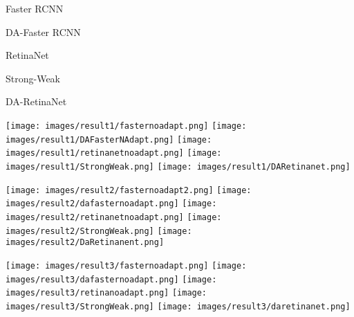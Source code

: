 \documentclass[preprint]{elsarticle}
\begin{document}
\begin{figure*}[t!]
            \centering
            \begin{minipage}{.19\textwidth}
            \centering
             Faster RCNN\\
            \end{minipage}
            \begin{minipage}{.19\textwidth}
            \centering
            DA-Faster RCNN\\
            \end{minipage}
            \begin{minipage}{.19\textwidth}
            \centering
             RetinaNet\\
            \end{minipage}
            \begin{minipage}{.19\textwidth}
            \centering
             Strong-Weak\\
            \end{minipage}
            \begin{minipage}{.19\textwidth}
            \centering
             DA-RetinaNet\\
            \end{minipage}
            
            \vspace{1mm}
            \texttt{[image: images/result1/fasternoadapt.png]}
            \texttt{[image: images/result1/DAFasterNAdapt.png]}
            \texttt{[image: images/result1/retinanetnoadapt.png]}
            \texttt{[image: images/result1/StrongWeak.png]}
            \texttt{[image: images/result1/DARetinanet.png]}
            
            \vspace{1mm}
            \texttt{[image: images/result2/fasternoadapt2.png]}
            \texttt{[image: images/result2/dafasternoadapt.png]}
            \texttt{[image: images/result2/retinanetnoadapt.png]}
            \texttt{[image: images/result2/StrongWeak.png]}
            \texttt{[image: images/result2/DaRetinanent.png]}
            
            \vspace{1mm}
            \texttt{[image: images/result3/fasternoadapt.png]}
            \texttt{[image: images/result3/dafasternoadapt.png]}
           \texttt{[image: images/result3/retinanoadapt.png]}
            \texttt{[image: images/result3/StrongWeak.png]}
            \texttt{[image: images/result3/daretinanet.png]}
            

\end{figure*}
\end{document}

